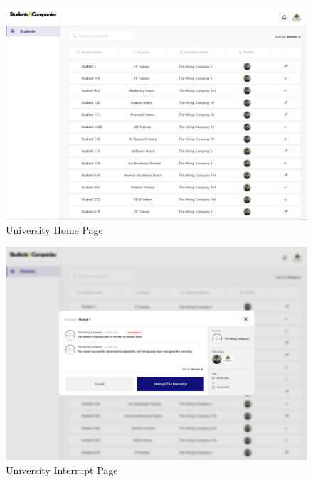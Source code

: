 \documentclass[a4paper,12pt]{article}
\begin{document}
\begin{figure}[H]
    \centering
    \includegraphics[scale = 0.40]{figures/UserInterfaces/University/UniversityHomePage.png}
    \caption{University Home Page}
     \centering
\end{figure}
\begin{figure}[H]
    \centering
    \includegraphics[scale = 0.40]{figures/UserInterfaces/University/InterruptPage.png}
    \caption{University Interrupt Page}
     \centering
\end{figure}
\end{document}
